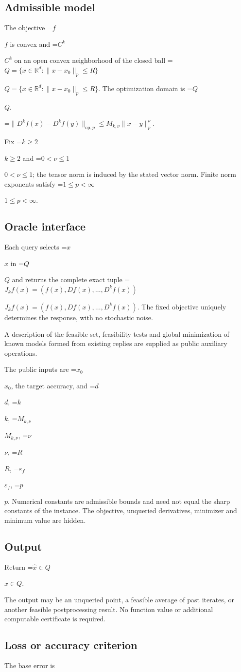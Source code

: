 \documentclass[10pt,a4paper]{article}
\newcommand{\AtlasMath}[1]{\par\begingroup\centering\setbox0=\hbox{$\displaystyle #1$}\ifdim\wd0>1.4\linewidth\typeout{ATLAS WIDE FORMULA: \the\wd0}\fi\ifdim\wd0>\linewidth\resizebox{\linewidth}{!}{\box0}\else\box0\fi\par\endgroup}
\newcommand{\AtlasInlineMath}[1]{\begingroup\setbox0=\hbox{$#1$}\ifdim\wd0>.4\linewidth\endgroup\AtlasMath{#1}\else\endgroup$#1$\fi}
\begin{document}
\subsection{Admissible model}
The objective \AtlasInlineMath{f} is convex and \AtlasInlineMath{C^k} on an open convex neighborhood of the closed ball \AtlasInlineMath{Q=\{x\in\mathbb{R}^d:\|x-x_0\|_{p}\le R\}}. The optimization domain is \AtlasInlineMath{Q}.


\AtlasMath{\|D^{k}f(x)-D^{k}f(y)\|_{\mathrm{op},p}\le M_{k,\nu}\|x-y\|_{p}^{\nu}.}


Fix \AtlasInlineMath{k\ge2} and \AtlasInlineMath{0<\nu\le1}; the tensor norm is induced by the stated vector norm. Finite norm exponents satisfy \AtlasInlineMath{1\le p<\infty}.

\subsection{Oracle interface}
Each query selects \AtlasInlineMath{x} in \AtlasInlineMath{Q} and returns the complete exact tuple \AtlasInlineMath{J_{k}f(x)=(f(x),Df(x),\ldots,D^{k}f(x))}. The fixed objective uniquely determines the response, with no stochastic noise.

A description of the feasible set, feasibility tests and global minimization of known models formed from existing replies are supplied as public auxiliary operations.

The public inputs are \AtlasInlineMath{x_0}, the target accuracy, and \AtlasInlineMath{d}, \AtlasInlineMath{k}, \AtlasInlineMath{M_{k,\nu}}, \AtlasInlineMath{\nu}, \AtlasInlineMath{R}, \AtlasInlineMath{\varepsilon_f}, \AtlasInlineMath{p}. Numerical constants are admissible bounds and need not equal the sharp constants of the instance. The objective, unqueried derivatives, minimizer and minimum value are hidden.

\subsection{Output}
Return \AtlasInlineMath{\widehat{x}\in Q}.

The output may be an unqueried point, a feasible average of past iterates, or another feasible postprocessing result. No function value or additional computable certificate is required.

\subsection{Loss or accuracy criterion}
The base error is
\end{document}
